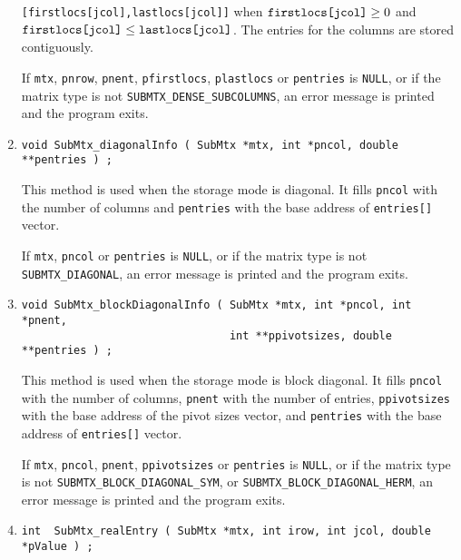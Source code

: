 \begin{enumerate}
{\tt [firstlocs[jcol],lastlocs[jcol]]} 
when $\mbox{\tt firstlocs[jcol]} \ge 0$
and $\mbox{\tt firstlocs[jcol]} \le \mbox{\tt lastlocs[jcol]}$.
The entries for the columns are stored contiguously.
\par {}
If {\tt mtx}, {\tt pnrow}, {\tt pnent}, {\tt pfirstlocs}, 
{\tt plastlocs} or {\tt pentries} is {\tt NULL},
or if the matrix type is not {\tt SUBMTX\_DENSE\_SUBCOLUMNS},
an error message is printed and the program exits.
\item
\begin{verbatim}
void SubMtx_diagonalInfo ( SubMtx *mtx, int *pncol, double **pentries ) ;
\end{verbatim}
This method is used when the storage mode is diagonal.
It fills
{\tt *pncol} with the number of columns
and {\tt *pentries} with the base address of {\tt entries[]} vector.
\par {}
If {\tt mtx}, {\tt pncol} or {\tt pentries} is {\tt NULL},
or if the matrix type is not {\tt SUBMTX\_DIAGONAL},
an error message is printed and the program exits.
\item
\begin{verbatim}
void SubMtx_blockDiagonalInfo ( SubMtx *mtx, int *pncol, int *pnent,
                                int **ppivotsizes, double **pentries ) ;
\end{verbatim}
This method is used when the storage mode is block diagonal.
It fills
{\tt *pncol} with the number of columns,
{\tt *pnent} with the number of entries,
{\tt *ppivotsizes} with the base address of the pivot sizes vector,
and {\tt *pentries} with the base address of {\tt entries[]} vector.
\par {}
If {\tt mtx}, {\tt pncol}, {\tt pnent}, {\tt ppivotsizes}
or {\tt pentries} is {\tt NULL},
or if the matrix type is not 
{\tt SUBMTX\_BLOCK\_DIAGONAL\_SYM},
or {\tt SUBMTX\_BLOCK\_DIAGONAL\_HERM},
an error message is printed and the program exits.
\item
\begin{verbatim}
int  SubMtx_realEntry ( SubMtx *mtx, int irow, int jcol, double *pValue ) ;
\end{verbatim}

\end{enumerate}
